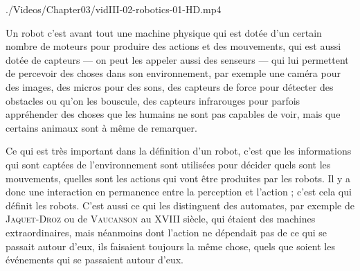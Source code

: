 \begin{marginvideo}
		{./Videos/Chapter03/vidIII-02-robotics-01-HD.mp4}%
\end{marginvideo}

Un robot c'est avant tout une machine physique qui est dotée d'un certain nombre de moteurs pour produire des actions et des mouvements, qui est aussi dotée de capteurs --- on peut les appeler aussi des senseurs --- qui lui permettent de percevoir des choses dans son environnement, par exemple une caméra pour des images, des micros pour des sons, des capteurs de force pour détecter des obstacles ou qu'on les bouscule, des capteurs infrarouges pour parfois appréhender des choses que les humains ne sont pas capables de voir, mais que certains animaux sont à même de remarquer. 

Ce qui est très important dans la définition d'un robot, c'est que les informations qui sont captées de l'environnement sont utilisées pour décider quels sont les mouvements, quelles sont les actions qui vont être produites par les robots. Il y a donc une interaction en permanence entre la perception et l'action ; c'est cela qui définit les robots. C'est aussi ce qui les distinguent des automates, par exemple de \textsc{Jaquet-­Droz} ou de \textsc{Vaucanson} au XVIII siècle, qui étaient des machines extraordinaires, mais néanmoins dont l'action ne dépendait pas de ce qui se passait autour d'eux, ils faisaient toujours la même chose, quels que soient les événements qui se passaient autour d'eux. 


